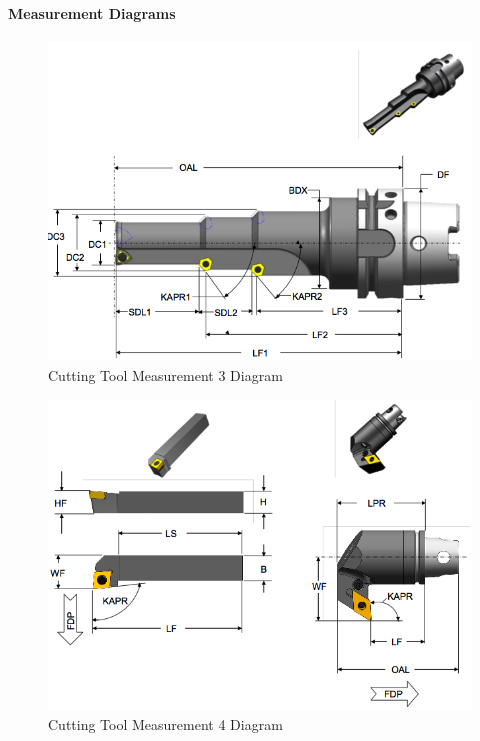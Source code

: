 \paragraph{Measurement Diagrams}\mbox{}
\label{sec:Measurement Diagrams}

\begin{figure}[ht]
  \centering
    \includegraphics[width=1.0\textwidth]{figures/Cutting Tool Measurement 3.png}
  \caption{Cutting Tool Measurement 3 Diagram}
  \label{fig:Cutting Tool Measurement 3 Diagram}
\end{figure}

\FloatBarrier


\begin{figure}[ht]
  \centering
    \includegraphics[width=1.0\textwidth]{figures/Cutting Tool Measurement 4.png}
  \caption{Cutting Tool Measurement 4 Diagram}
  \label{fig:Cutting Tool Measurement 4 Diagram}
\end{figure}

